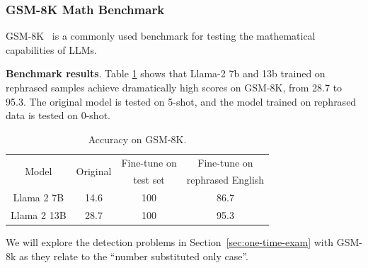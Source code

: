 \subsubsection{GSM-8K Math Benchmark}

GSM-8K~\citep{cobbe2021gsm8k} is a commonly used benchmark for testing the mathematical capabilities of LLMs. 

\textbf{Benchmark results}. Table \ref{table:gsm8k_basic_stats} shows that Llama-2 7b and 13b trained on rephrased samples achieve dramatically high scores on GSM-8K, from 28.7 to 95.3.
The original model is tested on 5-shot, and the model trained on rephrased data is tested on 0-shot.


\begin{table}[t]
\centering
\caption{Accuracy on GSM-8K.}
\label{table:gsm8k_basic_stats}
\footnotesize
\begin{tabular}{cccc}
\toprule
\multirow{2}{*}{Model} & \multirow{2}{*}{Original} & Fine-tune on & Fine-tune on \\
&  &  test set & rephrased English \\
\midrule
Llama 2 7B   &   14.6    &    100    &   86.7 \\
Llama 2 13B  &   28.7    &    100    &   95.3 \\
\bottomrule
\end{tabular}
\vspace{-10pt}
\end{table}

We will explore the detection problems in Section~\ref{sec:one-time-exam} with GSM-8k as they relate to the ``number substituted only case''.



